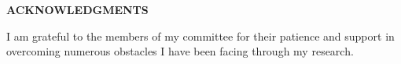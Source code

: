 \clearpage
\begin{center}
    \large\textbf{ACKNOWLEDGMENTS}
\end{center}
I am grateful to the members of my committee for their patience and support in overcoming numerous obstacles I have been facing through my research.